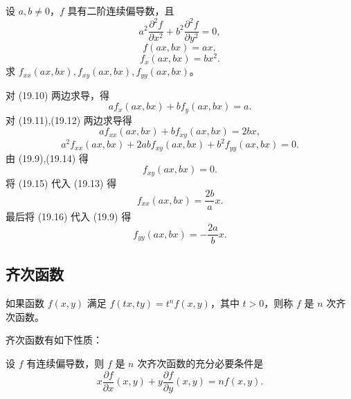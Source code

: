 \begin{xexample}[19.3.6]
设 $a,b\ne0$，$f$ 具有二阶连续偏导数，且
\begin{equation}
  a^2\frac{\partial^2f}{\partial x^2}+b^2\frac{\partial^2f}{\partial y^2}=0,
  \tag{19.9}
\end{equation}
\begin{equation}
  f(ax,bx)=ax,
  \tag{19.10}
\end{equation}
\begin{equation}
  f_x(ax,bx)=bx^2.
  \tag{19.11}
\end{equation}
求 $f_{xx}(ax,bx),f_{xy}(ax,bx),f_{yy}(ax,bx)$。
\end{xexample}
\begin{xsolution}
对 (19.10) 两边求导，得
\begin{equation}
  af_x(ax,bx)+bf_y(ax,bx)=a.
  \tag{19.12}
\end{equation}
对 (19.11),(19.12) 两边求导得
\begin{equation}
  af_{xx}(ax,bx)+bf_{xy}(ax,bx)=2bx,
  \tag{19.13}
\end{equation}
\begin{equation}
  a^2f_{xx}(ax,bx)+2abf_{xy}(ax,bx)+b^2f_{yy}(ax,bx)=0.
  \tag{19.14}
\end{equation}
由 (19.9),(19.14) 得
\begin{equation}
  f_{xy}(ax,bx)=0.
  \tag{19.15}
\end{equation}
将 (19.15) 代入 (19.13) 得
\begin{equation}
  f_{xx}(ax,bx)=\frac{2b}{a}x.
  \tag{19.16}
\end{equation}
最后将 (19.16) 代入 (19.9) 得
\[
  f_{yy}(ax,bx)=-\frac{2a}{b}x.
\]
\end{xsolution}

\subsection{齐次函数}

\begin{xdefinition}
如果函数 $f(x,y)$ 满足 $f(tx,ty)=t^n f(x,y)$，其中 $t>0$，则称 $f$ 是 $n$ 次齐次函数。
\end{xdefinition}
齐次函数有如下性质：

\begin{xproposition}[19.3.1]
设 $f$ 有连续偏导数，则 $f$ 是 $n$ 次齐次函数的充分必要条件是
\[
  x\frac{\partial f}{\partial x}(x,y)+y\frac{\partial f}{\partial y}(x,y)=nf(x,y).
\]
\end{xproposition}

